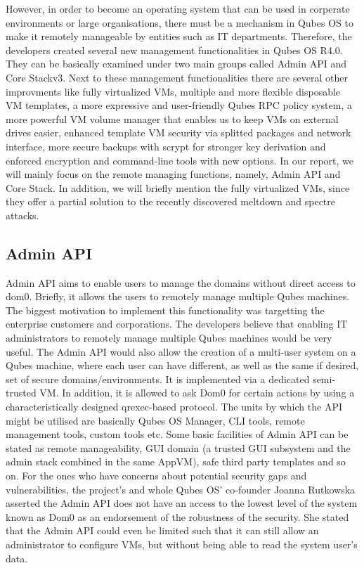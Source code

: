 \documentclass[runningheads,a4paper]{article}
\begin{document}
However, in order to become an operating system that can be used in corperate environments or large organisations, there must be a mechanism in Qubes OS to make it remotely manageable by entities such as IT departments.
Therefore, the developers created several new
management functionalities in Qubes OS R4.0. They can be basically examined under two
main groups called Admin API and Core Stackv3. Next to these management functionalities there are several other improvments like
fully virtualized VMs, multiple and more flexible disposable VM templates, a more expressive and user-friendly Qubes RPC policy system, a more powerful VM volume manager that enables us to keep VMs on external drives easier, enhanced template VM security via splitted packages and network interface, more secure backups with scrypt for stronger key derivation and enforced encryption and command-line tools with new options. In our report, we will mainly focus on the remote managing functions, namely, Admin API and Core Stack. In addition, we will briefly mention the fully virtualized VMs, since they offer a partial solution to the recently discovered meltdown and spectre attacks.

\subsection{Admin API}
Admin API aims to enable users to manage the domains without direct access to dom0. Briefly, it allows the users to remotely manage multiple Qubes machines. The biggest motivation to implement this functionality was targetting the enterprise customers and corporations. The developers believe that enabling IT administrators to remotely manage multiple Qubes machines would be very useful. The Admin API would also allow the creation of a multi-user system on a Qubes machine, where each user can have different, as well as the same if desired, set of secure domains/environments. It is implemented via a dedicated semi-trusted VM. In addition, it is allowed to ask Dom0 for certain actions by using a characteristically designed qrexec-based protocol. The units by which the API might be utilised are basically Qubes OS Manager, CLI tools, remote management tools, custom tools etc. Some basic facilities of Admin API can be stated as remote manageability, GUI domain (a trusted GUI subsystem and the admin stack combined in the same AppVM), safe third party templates and so on. For the ones who have concerns about potential security gaps and vulnerabilities, the project’s and whole Qubes OS’ co-founder Joanna Rutkowska asserted the Admin API does not have an access to the lowest level of the system known as Dom0 as an endorsement of the robustness of the security. She stated that the Admin API could even be limited such that it can still allow an administrator to configure VMs, but without being able to read the system user’s data. 
\end{document}

